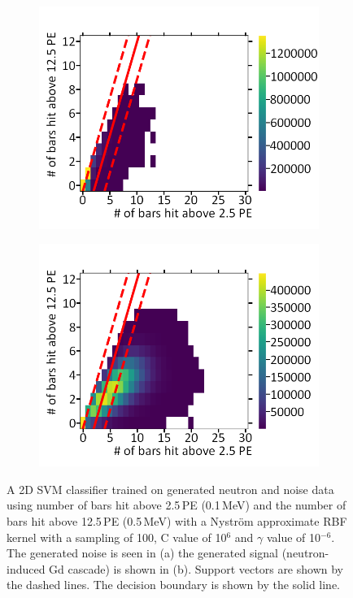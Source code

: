 \begin{figure}[!h]
\centering
\begin{subfigure}{.5\textwidth}
  \centering
  \includegraphics[width=\linewidth]{Chapter4/Figs/Raster/noiseNeutronSVM_C1e6_g1e-6MedText.png}
  \captionsetup{width=.9\linewidth}
  \caption{}
  \label{subFig:noiseNeutronSVM_C1e6_g1e-6}
\end{subfigure}%
\begin{subfigure}{.5\textwidth}
  \centering
  \includegraphics[width=\linewidth]{Chapter4/Figs/Raster/signalNeutronSVM_C1e6_g1e-6MedText.png}
  \captionsetup{width=.9\linewidth}
  \caption{}
  \label{subFig:signalNeutronSVM_C1e6_g1e-6}
\end{subfigure}
\caption{A 2D SVM classifier trained on generated neutron and noise data using number of bars hit above 2.5\,PE (0.1\,MeV) and the number of bars hit above 12.5\,PE (0.5\,MeV) with a Nyström approximate RBF kernel with a sampling of 100, C value of 10$^6$ and $\gamma$ value of 10$^{-6}$. The generated noise is seen in (a) the generated signal (neutron-induced Gd cascade) is shown in (b). Support vectors are shown by the dashed lines. The decision boundary is shown by the solid line.}
\label{fig:signalAndNoiseNeutronSVM_C1e6_g1e-6}
\end{figure}

